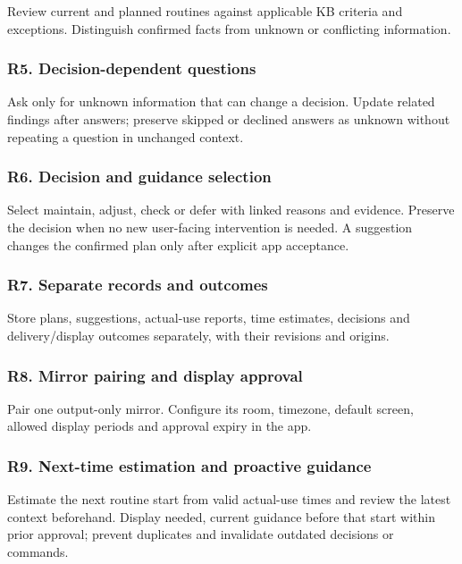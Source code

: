 \documentclass[conference,letterpaper]{IEEEtran}
\begin{document}
Review current and planned routines against applicable KB criteria and exceptions. Distinguish confirmed facts from unknown or conflicting information.

\subsubsection*{R5. Decision-dependent questions}

Ask only for unknown information that can change a decision. Update related findings after answers; preserve skipped or declined answers as unknown without repeating a question in unchanged context.

\subsubsection*{R6. Decision and guidance selection}

Select maintain, adjust, check or defer with linked reasons and evidence. Preserve the decision when no new user-facing intervention is needed. A suggestion changes the confirmed plan only after explicit app acceptance.

\subsubsection*{R7. Separate records and outcomes}

Store plans, suggestions, actual-use reports, time estimates, decisions and delivery/display outcomes separately, with their revisions and origins.

\subsubsection*{R8. Mirror pairing and display approval}

Pair one output-only mirror. Configure its room, timezone, default screen, allowed display periods and approval expiry in the app.

\subsubsection*{R9. Next-time estimation and proactive guidance}

Estimate the next routine start from valid actual-use times and review the latest context beforehand. Display needed, current guidance before that start within prior approval; prevent duplicates and invalidate outdated decisions or commands.
\end{document}
